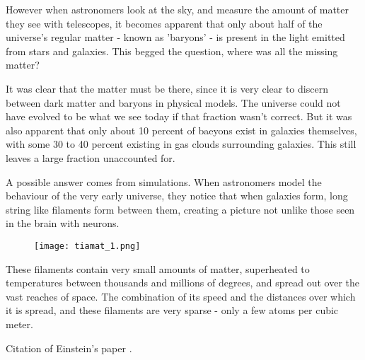 \documentclass{nature}
\begin{document}
However when astronomers look at the sky, and measure the amount of matter they see with telescopes, it becomes apparent that only about half of the universe's regular matter - known as 'baryons' - is present in the light emitted from stars and galaxies. This begged the question, where was all the missing matter? 

It was clear that the matter must be there, since it is very clear to discern between dark matter and baryons in physical models. The universe could not have evolved to be what we see today if that fraction wasn't correct. But it was also apparent that only about 10 percent of baeyons exist in galaxies themselves, with some 30 to 40 percent existing in gas clouds surrounding galaxies. This still leaves a large fraction unaccounted for. 

A possible answer comes from simulations. When astronomers model the behaviour of the very early universe, they notice that when galaxies form, long string like filaments form between them, creating a picture not unlike those seen in the brain with neurons.

\begin{figure}
    \texttt{[image: tiamat\_1.png]}
\end{figure}


These filaments contain very small amounts of matter, superheated to temperatures between thousands and millions of degrees, and spread out over the vast reaches of space. The combination of its speed and the distances over which it is spread, and these filaments are very sparse - only a few atoms per cubic meter. 



Citation of Einstein's paper \cite{Einstein}.



\end{document}

